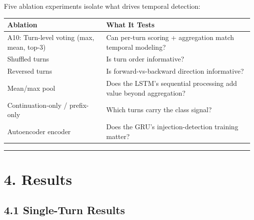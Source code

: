 \documentclass[
  11pt,
]{report}
\begin{document}
Five ablation experiments isolate what drives temporal detection:

{\def\LTcaptype{} %
\begin{longtable}[]{@{}
  >{\raggedright\arraybackslash}p{}
  >{\raggedright\arraybackslash}p{}@{}}
\toprule\noalign{}
\begin{minipage}[b]{\linewidth}\raggedright
Ablation
\end{minipage} & \begin{minipage}[b]{\linewidth}\raggedright
What It Tests
\end{minipage} \\
\midrule\noalign{}
\endhead
\bottomrule\noalign{}
\endlastfoot
A10: Turn-level voting (max, mean, top-3) & Can per-turn scoring +
aggregation match temporal modeling? \\
Shuffled turns & Is turn order informative? \\
Reversed turns & Is forward-vs-backward direction informative? \\
Mean/max pool & Does the LSTM's sequential processing add value beyond
aggregation? \\
Continuation-only / prefix-only & Which turns carry the class signal? \\
Autoencoder encoder & Does the GRU's injection-detection training
matter? \\
\end{longtable}
}

\begin{center}\rule{0.5\linewidth}{0.5pt}\end{center}

\section{4. Results}\label{results}

\subsection{4.1 Single-Turn Results}\label{single-turn-results}
\end{document}
